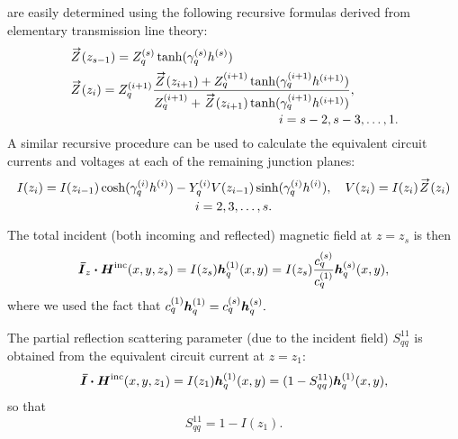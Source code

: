 are easily determined using the following recursive
formulas derived from elementary transmission line theory:
\begin{subequations}
  \begin{align}
    &\Zright(z_{s-1}) = Z_{q}^{(s)} \tanh(\gamma_{q}^{(s)} h^{(s)}) \\
    &\Zright(z_i) = Z_{q}^{(i+1)} 
    \frac%
    {\Zright(z_{i+1}) + Z_{q}^{(i+1)}\tanh(\gamma_{q}^{(i+1)} h^{(i+1)})}%
    {Z_{q}^{(i+1)} + \Zright(z_{i+1})\tanh(\gamma_{q}^{(i+1)}
      h^{(i+1)})}, 
    \notag \\
    & \mkern300mu i = s-2,s-3,\ldots,1.
  \end{align}
\end{subequations}
A similar recursive procedure can be used to calculate the
equivalent circuit currents and voltages
at each of the remaining junction planes:
\begin{multline}
  I(z_i) = I(z_{i-1}) \cosh(\gamma_{q}\eye h\eye)
  - Y_q\eye
  V(z_{i-1}) \sinh (\gamma_{q}\eye h\eye), \quad
  V(z_i) = I(z_i)  \Zright(z_i) \\
  i = 2,3,\ldots,s. 
  \label{eq:Mrecurseright}
\end{multline}

The total incident (both incoming and reflected) magnetic field at
$z=z_s$ is then
\begin{equation}
  \boldsymbol{\bar{I}}_z \boldsymbol{\cdot} \boldsymbol{H}^{\text{inc}}(x,y,z_s) = I(z_s) \boldsymbol{h}_q^{(1)}(x,y)
  = I(z_s) \frac{c_q^{(s)}}{c_q^{(1)}} \boldsymbol{h}_q^{(s)}(x,y),
\end{equation}
where we used the fact that $ c_q^{(1)} \boldsymbol{h}_q^{(1)}  = c_q^{(s)} \boldsymbol{h}_q^{(s)}.$

The partial reflection scattering parameter (due to the incident
field) $S^{11}_{qq}$ is obtained from the equivalent circuit current
at $z=z_{1}$:
\begin{equation}
  \boldsymbol{\bar{I}} \boldsymbol{\cdot} \boldsymbol{H}^{\text{inc}}(x,y,z_{1}) = I(z_{1}) \boldsymbol{h}_q^{(1)}(x,y) 
  = (1-S^{11}_{qq}) \boldsymbol{h}_q^{(1)}(x,y),
\end{equation}
so that
\begin{equation}
  S^{11}_{qq} = 1-I(z_{1}).
\end{equation}



